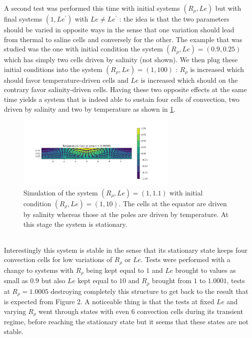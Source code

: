 \documentclass{article}
\begin{document}
\par
A second test was performed this time with initial systems $(R_{\rho},Le)$ but with final systems $(1,Le^{\prime})$ with $Le \neq Le^{\prime}$ : the idea is that the two parameters should be varied in opposite ways in the sense that one variation should lead from thermal to saline cells and conversely for the other. The example that was studied was the one with initial condition the system $(R_{\rho},Le) = (0.9,0.25)$ which has simply two cells driven by salinity (not shown). We then plug these initial conditions into the system $(R_{\rho},Le) = (1,100)$ : $R_{\rho}$ is increased which should favor temperature-driven cells and $Le$ is increased which should on the contrary favor salinity-driven cells. Having these two opposite effects at the same time yields a system that is indeed able to sustain four cells of convection, two driven by salinity and two by temperature as shown in \cref{fig:four_cells}. 
\\
\begin{figure}[ht]
  \centering
  \includegraphics[width=0.7\textwidth]{images/last_subsection/four_cells.png}
  \caption{Simulation of the system $(R_{\rho},Le) = (1,1.1)$ with initial condition $(R_{\rho},Le) = (1,10)$. The cells at the equator are driven by salinity whereas those at the poles are driven by temperature. At this stage the system is stationary.}
  \label{fig:four_cells}
\end{figure}
\\
Interestingly this system is stable in the sense that its stationary state keeps four convection cells for low variations of $R_{\rho}$ or $Le$. Tests were performed with a change to systems with $R_{\rho}$ being kept equal to $1$ and $Le$ brought to values as small as $0.9$ but also $Le$ kept equal to $10$ and $R_{\rho}$ brought from $1$ to $1.0001$, tests at $R_{\rho} = 1.0005$ destroying completely this structure to get back to the result that is expected from Figure 2. A noticeable thing is that the tests at fixed $Le$ and varying $R_{\rho}$ went through states with even 6 convection cells during its transient regime, before reaching the stationary state but it seems that these states are not stable.
\end{document}
